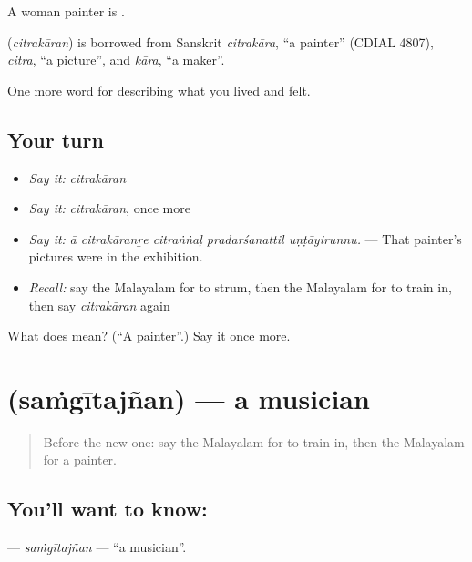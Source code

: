 A woman painter is .

\begin{cousinweb}
\textbf{} (\emph{citrakāran}) is borrowed from Sanskrit \emph{citrakāra}, \textquotedblleft{}a painter\textquotedblright{} (CDIAL 4807), \emph{citra}, \textquotedblleft{}a picture\textquotedblright{}, and \emph{kāra}, \textquotedblleft{}a maker\textquotedblright{}.
\end{cousinweb}

\begin{grammarlens}[title={What you've built}]
One more word for describing what you lived and felt.
\end{grammarlens}

\subsection*{Your turn}
\begin{itemize}
\raggedright
  \item \emph{Say it:} \emph{citrakāran}
  \item \emph{Say it:} \emph{citrakāran}, once more
  \item \emph{Say it:} \emph{ā citrakāranṟe citraṅṅaḷ pradarśanattil uṇṭāyirunnu.} — That painter's pictures were in the exhibition.
  \item \emph{Recall:} say the Malayalam for to strum, then the Malayalam for to train in, then say \emph{citrakāran} again
\end{itemize}

\begin{tcolorbox}[breakable,colback=teal!4,colframe=teal!35!black,title={Before you move on}]
What does  mean? (\textquotedblleft{}A painter\textquotedblright{}.) Say it once more.
\end{tcolorbox}
\section[\texorpdfstring{\ml{സംഗീതജ്ഞൻ} (saṁgītajñan)}{സംഗീതജ്ഞൻ (saṁgītajñan)}]{ (saṁgītajñan) — a musician}

\label{lesson:ML-C565-samgitajnan}



\begin{quote}
Before the new one: say the Malayalam for to train in, then the Malayalam for a painter.
\end{quote}

\subsection*{You'll want to know: }
\textbf{} — \emph{saṁgītajñan} — \textquotedblleft{}a musician\textquotedblright{}.

